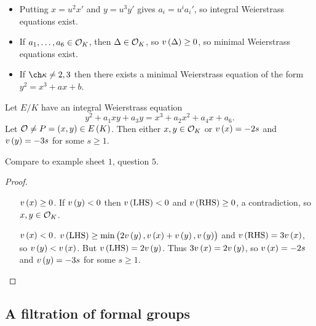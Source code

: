 \begin{remark*}
\hfill
\begin{itemize}
\item Putting $ x = u^2x' $ and $ y = u^3y' $ gives $ a_i = u^ia_i' $, so integral Weierstrass equations exist.
\item If $ a_1, \dots, a_6 \in \mathcal{O}_K $, then $ \Delta \in \mathcal{O}_K $, so $ v\br{\Delta} \ge 0 $, so minimal Weierstrass equations exist.
\item If $ \ch \kappa \ne 2, 3 $ then there exists a minimal Weierstrass equation of the form $ y^2 = x^3 + ax + b $.
\end{itemize}
\end{remark*}

\begin{lemma}
\label{lem:9.1}
Let $ E / K $ have an integral Weierstrass equation
$$ y^2 + a_1xy + a_3y = x^3 + a_2x^2 + a_4x + a_6. $$
Let $ \OOO \ne P = \br{x, y} \in E\br{K} $. Then either $ x, y \in \mathcal{O}_K $ or $ v\br{x} = -2s $ and $ v\br{y} = -3s $ for some $ s \ge 1 $.
\end{lemma}

Compare to example sheet $ 1 $, question $ 5 $.

\begin{proof}
\hfill
\begin{itemize}[leftmargin=0.5in]
\item[$ v\br{x} \ge 0 $.] If $ v\br{y} < 0 $ then $ v\br{\text{LHS}} < 0 $ and $ v\br{\text{RHS}} \ge 0 $, a contradiction, so $ x, y \in \mathcal{O}_K $.
\item[$ v\br{x} < 0 $.] $ v\br{\text{LHS}} \ge \min\br{2v\br{y}, v\br{x} + v\br{y}, v\br{y}} $ and $ v\br{\text{RHS}} = 3v\br{x} $, so $ v\br{y} < v\br{x} $. But $ v\br{\text{LHS}} = 2v\br{y} $. Thus $ 3v\br{x} = 2v\br{y} $, so $ v\br{x} = -2s $ and $ v\br{y} = -3s $ for some $ s \ge 1 $.
\end{itemize}
\end{proof}

\subsection{A filtration of formal groups}

